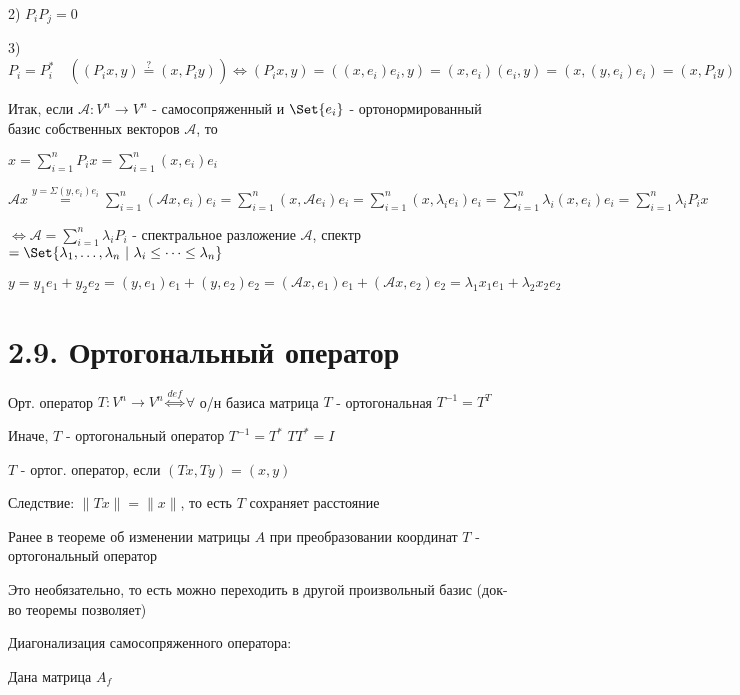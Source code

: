 \documentclass[12pt]{article}
\begin{document}
    2) $P_i P_j = 0$

    3) $P_i = P_i^* \quad ((P_i x, y) \stackrel{?}{=} (x, P_i y)) \Longleftrightarrow (P_i x, y) = ((x, e_i) e_i, y) = (x, e_i) (e_i, y) = (x, (y, e_i) e_i) = (x, P_i y)$

    Итак, если $\mathcal{A}: V^n \to V^n$ - самосопряженный и $\Set{e_i}$ - ортонормированный базис собственных векторов $\mathcal{A}$, то

    $x = \sum_{i = 1}^{n} P_i x = \sum_{i = 1}^{n} (x, e_i) e_i$

    $\mathcal{A} x \stackrel{y = \Sigma (y, e_i) e_i}{=} \sum_{i = 1}^{n} (\mathcal{A}x, e_i) e_i =
    \sum_{i = 1}^{n} (x, \mathcal{A}e_i) e_i = \sum_{i = 1}^{n} (x, \lambda_i e_i) e_i =
    \sum_{i = 1}^{n} \lambda_i (x, e_i) e_i = \sum_{i = 1}^{n} \lambda_i P_i x$

    $\Longleftrightarrow \mathcal{A} = \sum_{i = 1}^{n} \lambda_i P_i$ - спектральное разложение $\mathcal{A}$,
    спектр $= \Set{\lambda_1, \dots, \lambda_n \ | \ \lambda_i \leq \dots \leq \lambda_n}$

    \Ex

    $y = y_1 e_1 + y_2 e_2 = (y, e_1) e_1 + (y, e_2) e_2 = (\mathcal{A}x, e_1) e_1 + (\mathcal{A}x, e_2) e_2 = \lambda_1 x_1 e_1 + \lambda_2 x_2 e_2$

    \section{2.9. Ортогональный оператор}

    \hypertarget{orthogonaloperator}{}

    \Mem Орт. оператор $T: V^n \to V^n \overset{def}{\Longleftrightarrow} \forall$ о/н базиса матрица $T$ - ортогональная $T^{-1} = T^T$

    \Nota Иначе, $T$ - ортогональный оператор \Longleftrightarrow $T^{-1} = T^*$ \Longrightarrow $T T^* = I$

    \Def $T$ - ортог. оператор, если $(Tx, Ty) = (x, y)$

    Следствие: $\|Tx\| = \|x\|$, то есть $T$ сохраняет расстояние

    \Nota Ранее в теореме об изменении матрицы $A$ при преобразовании координат $T$ - ортогональный оператор

    Это необязательно, то есть можно переходить в другой произвольный базис (док-во теоремы позволяет)

    Диагонализация самосопряженного оператора:

    Дана матрица $A_f$
\end{document}
